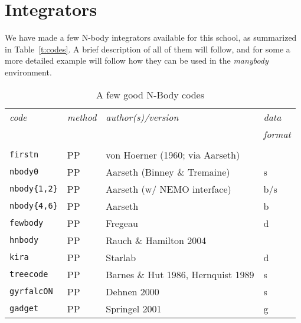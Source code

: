 \chapter                {Integrators}

We have made a few N-body integrators available for this school, as summarized
in Table~\ref{t:codes}. A brief description of all of them will follow, and 
for some a more detailed example will follow how they
can be used in the {\it manybody} environment. 



\begin{center}
\begin{table}[h]
\caption{A few good N-Body codes}
\begin{tabular}{||l|l|l|l||}

\hline 
{\it code} & {\it method} & {\it author(s)/version}  & {\it data} \\
       &&& {\it format} \\
\hline &&& \\

{\tt firstn} & PP & von Hoerner (1960; via Aarseth)  & \\

{\tt nbody0} & PP & Aarseth (Binney \& Tremaine) & s \\

{\tt nbody\{1,2\}} & PP & Aarseth (w/ NEMO interface) & b/s\\

{\tt nbody\{4,6\}} & PP &  Aarseth  & b \\

{\tt fewbody} & PP & Fregeau   & d \\

{\tt hnbody}  & PP & Rauch \& Hamilton 2004 & \\

{\tt kira} & PP & Starlab & d \\

{\tt treecode} & PP & Barnes \& Hut 1986, Hernquist 1989 & s \\

{\tt gyrfalcON} & PP & Dehnen 2000 & s \\


{\tt gadget} & PP & Springel 2001  & g \\


\end{tabular}
\end{table}
\end{center}
